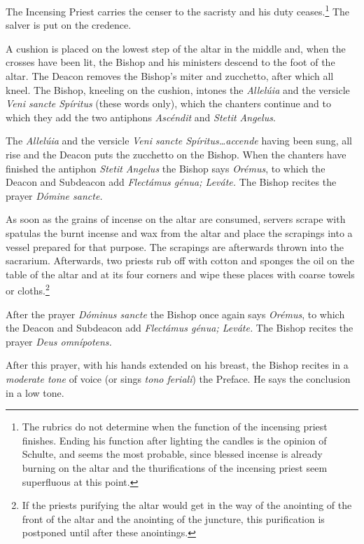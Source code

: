 \documentclass[letterpaper]{report}
\begin{document}
{    The Incensing Priest carries the censer to the sacristy and his duty
    ceases.\footnote{The rubrics do not determine when the function of the
    incensing priest finishes. Ending his function after lighting the candles
    is the opinion of Schulte, and seems the most probable, since blessed
    incense is already burning on the altar and the thurifications of the
    incensing priest seem superfluous at this point.} The salver is put
    on the credence.

    \rubric A cushion is placed on the lowest step of the altar in the middle
    and, when the crosses have been lit, the Bishop and his ministers descend
    to the foot of the altar. The Deacon removes the Bishop's miter and
    zucchetto, after which all kneel. The Bishop, kneeling on the cushion,
    intones the \textit{Allel\'uia} and the versicle \textit{Veni sancte
    Spíritus} (these words only), which the chanters continue and to which they
    add the two antiphons \textit{Ascéndit} and \textit{Stetit Angelus}.

    \rubric The \textit{Allel\'uia} and the versicle \textit{Veni sancte
    Spíritus\dots accende} having been sung, all rise and the Deacon puts the
    zucchetto on the Bishop. When the chanters have finished the antiphon
    \textit{Stetit Angelus} the Bishop says \textit{Orémus}, to which the Deacon
    and Subdeacon add \textit{Flectámus génua; Leváte.} The Bishop recites the
    prayer \textit{Dómine sancte.}

    \rubric As soon as the grains of incense on the altar are consumed, servers
    scrape with spatulas the burnt incense and wax from the altar and place the
    scrapings into a vessel prepared for that purpose. The scrapings are
    afterwards thrown into the sacrarium. Afterwards, two priests rub off with
    cotton and sponges the oil on the table of the altar and at its four
    corners and wipe these places with coarse towels or cloths.\footnote{If the
    priests purifying the altar would get in the way of the anointing of the
    front of the altar and the anointing of the juncture, this purification is
    postponed until after these anointings.}

    \rubric After the prayer \textit{Dóminus sancte} the Bishop once again says
    \textit{Orémus}, to which the Deacon and Subdeacon add \textit{Flectámus
    génua; Leváte.} The Bishop recites the prayer \textit{Deus omnípotens.}

    \rubric After this prayer, with his hands extended on his breast, the Bishop
    recites in a \textit{moderate tone} of voice (or sings \textit{tono feriali})
    the Preface. He says the conclusion in a low tone.

}
\end{document}
